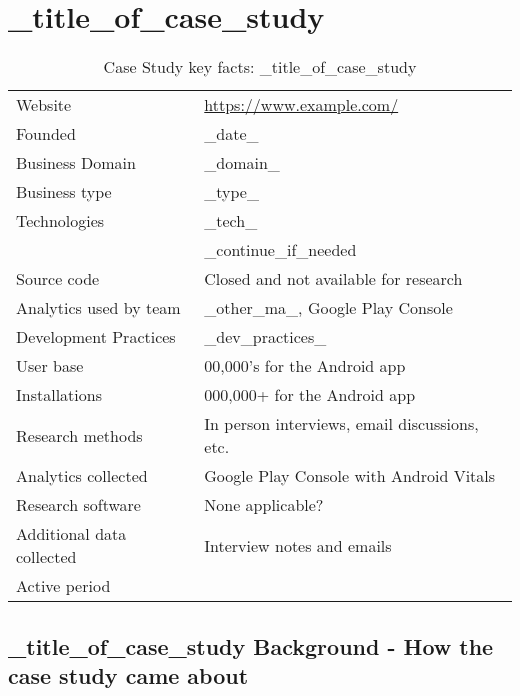 \section{_title_of_case_study} %

{\renewcommand{\arraystretch}{0.8}%
\begin{table}[htbp!]
    \centering
    \small
    \setlength{\tabcolsep}{1pt}
    \begin{tabular}{ll}
       \toprule
       Website &\url{https://www.example.com/} \\
       Founded & _date_ \\
       Business Domain & _domain_ \\
       Business type & _type_ \\
       Technologies  & _tech_ \\
       & _continue_if_needed \\
       Source code  &Closed and not available for research \\
       Analytics used by team & _other_ma_, Google Play Console \\
       Development Practices & _dev_practices_ \\
       \midrule
       User base & 00,000's for the Android app \\
       Installations & 000,000+ for the Android app \\
       \midrule
       Research methods &In person interviews, email discussions, etc. \\
       Analytics collected &Google Play Console with Android Vitals \\
       Research software & None applicable? \\
       Additional data collected &Interview notes and emails \\
       Active period & \\
       \bottomrule
    \end{tabular}
    \caption{Case Study key facts: _title_of_case_study}
    \label{tab:blank_case_study_anaytics_overview}
\end{table}
}

\subsection{_title_of_case_study Background - How the case study came about}

